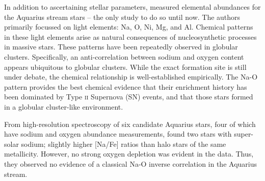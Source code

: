 \documentclass{emulateapj}
\begin{document}
In addition to ascertaining stellar parameters, \citet{wylie-de-boer;et-al_2012} measured elemental abundances for the Aquarius stream stars -- the only study to do so until now. The authors primarily focussed on light elements: Na, O, Ni, Mg, and Al. Chemical patterns in these light elements arise as natural consequences of nucleosynthetic processes in massive stars. These patterns have been repeatedly observed in globular clusters. Specifically, an anti-correlation between sodium and oxygen content appears ubiquitous to globular clusters. While the exact formation site is still under debate, the chemical relationship is well-established empirically. The Na-O pattern provides the best chemical evidence that their enrichment history has been dominated by Type \textsc{ii} Supernova (SN) events, and that those stars formed in a globular cluster-like environment.


From high-resolution spectroscopy of six candidate Aquarius stars, four of which have sodium and oxygen abundance measurements, \citet{wylie-de-boer;et-al_2012} found two stars with super-solar sodium; slightly higher [Na/Fe] ratios than halo stars of the same metallicity. However, no strong oxygen depletion was evident in the data. Thus, they observed no evidence of a classical Na-O inverse correlation in the Aquarius stream.
\end{document}
